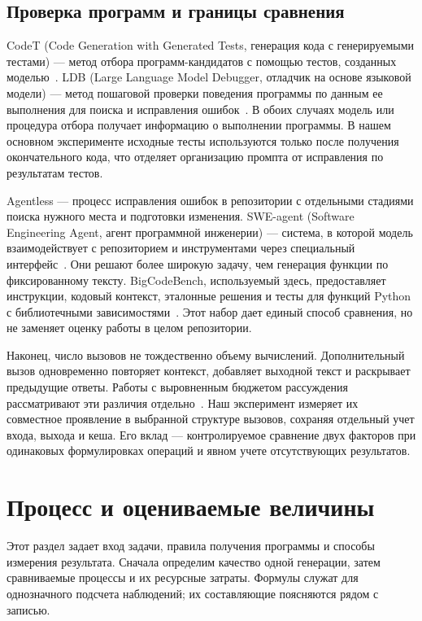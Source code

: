 \subsection{Проверка программ и границы сравнения}
CodeT (Code Generation with Generated Tests, генерация кода с генерируемыми тестами) --- метод отбора программ-кандидатов с помощью тестов, созданных моделью~\cite{chen2023codet}. LDB (Large Language Model Debugger, отладчик на основе языковой модели) --- метод пошаговой проверки поведения программы по данным ее выполнения для поиска и исправления ошибок~\cite{zhong2024ldb}. В обоих случаях модель или процедура отбора получает информацию о выполнении программы. В нашем основном эксперименте исходные тесты используются только после получения окончательного кода, что отделяет организацию промпта от исправления по результатам тестов.

Agentless --- процесс исправления ошибок в репозитории с отдельными стадиями поиска нужного места и подготовки изменения. SWE-agent (Software Engineering Agent, агент программной инженерии) --- система, в которой модель взаимодействует с репозиторием и инструментами через специальный интерфейс~\cite{xia2025agentless,yang2024sweagent}. Они решают более широкую задачу, чем генерация функции по фиксированному тексту. BigCodeBench, используемый здесь, предоставляет инструкции, кодовый контекст, эталонные решения и тесты для функций Python с библиотечными зависимостями~\cite{zhuo2024bigcodebench}. Этот набор дает единый способ сравнения, но не заменяет оценку работы в целом репозитории.

Наконец, число вызовов не тождественно объему вычислений. Дополнительный вызов одновременно повторяет контекст, добавляет выходной текст и раскрывает предыдущие ответы. Работы с выровненным бюджетом рассуждения рассматривают эти различия отдельно~\cite{tran2026budget}. Наш эксперимент измеряет их совместное проявление в выбранной структуре вызовов, сохраняя отдельный учет входа, выхода и кеша. Его вклад --- контролируемое сравнение двух факторов при одинаковых формулировках операций и явном учете отсутствующих результатов.

\FloatBarrier
\section{Процесс и оцениваемые величины}\label{sec:process}
Этот раздел задает вход задачи, правила получения программы и способы измерения результата. Сначала определим качество одной генерации, затем сравниваемые процессы и их ресурсные затраты. Формулы служат для однозначного подсчета наблюдений; их составляющие поясняются рядом с записью.

